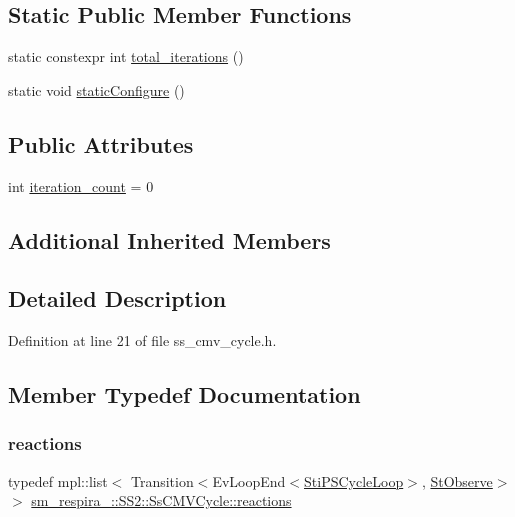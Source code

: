 \subsection*{Static Public Member Functions}
\begin{DoxyCompactItemize}
\item 
static constexpr int \hyperlink{structsm__respira__1_1_1SS2_1_1SsCMVCycle_afcff674911a8780139e6da80e1482c1f}{total\+\_\+iterations} ()
\item 
static void \hyperlink{structsm__respira__1_1_1SS2_1_1SsCMVCycle_adad0cf7e5c85e78ea1f28179697ae3ee}{static\+Configure} ()
\end{DoxyCompactItemize}
\subsection*{Public Attributes}
\begin{DoxyCompactItemize}
\item 
int \hyperlink{structsm__respira__1_1_1SS2_1_1SsCMVCycle_af41ac0924309a8e91539577a6b50c1b3}{iteration\+\_\+count} = 0
\end{DoxyCompactItemize}
\subsection*{Additional Inherited Members}


\subsection{Detailed Description}


Definition at line 21 of file ss\+\_\+cmv\+\_\+cycle.\+h.



\subsection{Member Typedef Documentation}
\mbox{\label{structsm__respira__1_1_1SS2_1_1SsCMVCycle_a95e2f9a21c894a79b29b1179120c3d52}} 
\subsubsection{\texorpdfstring{reactions}{reactions}}
{\footnotesize\ttfamily typedef mpl\+::list$<$ Transition$<$Ev\+Loop\+End$<$\hyperlink{structsm__respira__1_1_1cmv__cycle__inner__states_1_1StiPSCycleLoop}{Sti\+P\+S\+Cycle\+Loop}$>$, \hyperlink{structsm__respira__1_1_1StObserve}{St\+Observe}$>$ $>$ \hyperlink{structsm__respira__1_1_1SS2_1_1SsCMVCycle_a95e2f9a21c894a79b29b1179120c3d52}{sm\+\_\+respira\+\_\+::\+S\+S2\+::\+Ss\+C\+M\+V\+Cycle\+::reactions}}



